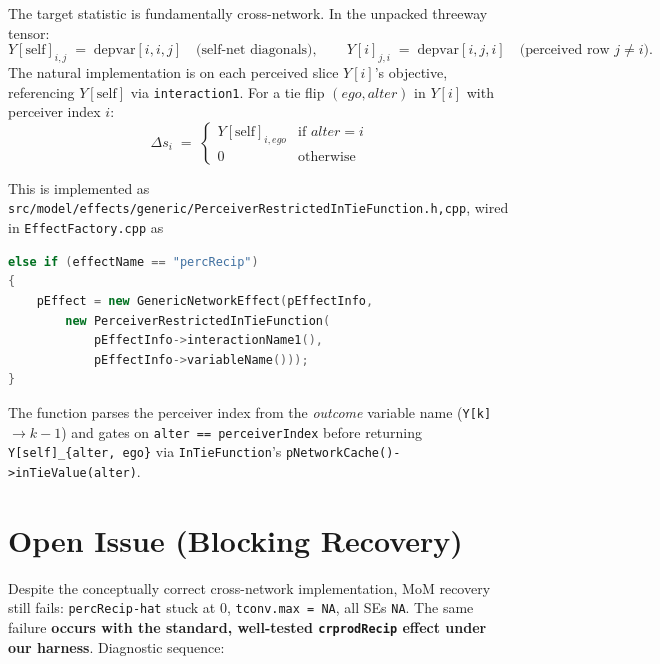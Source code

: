 \documentclass[11pt]{article}
\newcommand{\self}{\mathrm{self}}
\newcommand{\file}[1]{\texttt{#1}}
\begin{document}
The target statistic is fundamentally cross-network.  In the unpacked
threeway tensor:
\[
Y[\self]_{i,j} \;=\; \text{depvar}[i,i,j]
\quad\text{(self-net diagonals)},
\qquad
Y[i]_{j,i} \;=\; \text{depvar}[i,j,i]
\quad\text{(perceived row $j \neq i$)}.
\]
The natural implementation is on each perceived slice $Y[i]$'s
objective, referencing $Y[\self]$ via \texttt{interaction1}.  For a tie
flip $(e\!g\!o, alter)$ in $Y[i]$ with perceiver index $i$:
\[
\Delta s_i \;=\;
\begin{cases}
Y[\self]_{i, ego} & \text{if } alter = i\\
0                  & \text{otherwise}
\end{cases}
\]

This is implemented as
\file{src/model/effects/generic/PerceiverRestrictedInTieFunction.{h,cpp}},
wired in \file{EffectFactory.cpp} as
\begin{lstlisting}[language=C++]
else if (effectName == "percRecip")
{
    pEffect = new GenericNetworkEffect(pEffectInfo,
        new PerceiverRestrictedInTieFunction(
            pEffectInfo->interactionName1(),
            pEffectInfo->variableName()));
}
\end{lstlisting}
The function parses the perceiver index from the \emph{outcome}
variable name (\texttt{Y[k]} $\to k\!-\!1$) and gates on
\texttt{alter == perceiverIndex} before returning
\texttt{Y[self]\_\{alter, ego\}} via \texttt{InTieFunction}'s
\texttt{pNetworkCache()->inTieValue(alter)}.

\section{Open Issue (Blocking Recovery)}

Despite the conceptually correct cross-network implementation, MoM
recovery still fails: \texttt{percRecip-hat} stuck at $0$,
\texttt{tconv.max = NA}, all SEs \texttt{NA}.  The same failure
\textbf{occurs with the standard, well-tested \texttt{crprodRecip}
effect under our harness}.  Diagnostic sequence:
\end{document}
